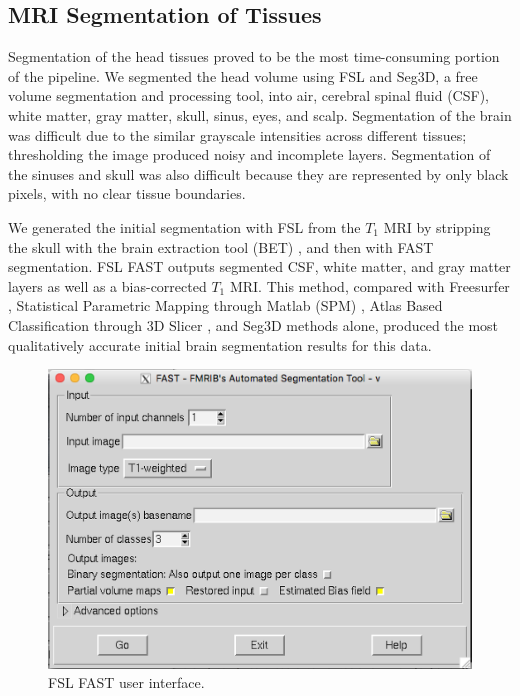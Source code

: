 \subsection{MRI Segmentation of Tissues}
\label{sec:Seg}


Segmentation of the head tissues proved to be the most time-consuming portion of the pipeline. We segmented the head volume using FSL and Seg3D, a free volume segmentation and processing tool, \cite{ref:seg3d} into air, cerebral spinal fluid (CSF), white matter, gray matter, skull, sinus, eyes, and scalp. Segmentation of the brain was difficult due to the similar grayscale intensities across different tissues; thresholding the image produced noisy and incomplete layers. Segmentation of the sinuses and skull was also difficult because they are represented by only black pixels, with no clear tissue boundaries.

We generated the initial segmentation with FSL from the $T_1$ MRI by stripping the skull with the brain extraction tool (BET) \cite{ref:bet1}, and then with FAST segmentation. FSL FAST outputs segmented CSF, white matter, and gray matter layers as well as a bias-corrected $T_1$ MRI. This method, compared with Freesurfer \cite{ref:freesurf}, Statistical Parametric Mapping through Matlab (SPM) \cite{ref:spm}, Atlas Based Classification through 3D Slicer \cite{ref:abc}, and Seg3D methods alone, produced the most qualitatively accurate initial brain segmentation results for this data.

\begin{figure}[H]
    \centering
    \includegraphics[width=.8\textwidth]{Figures/FSL_FAST}
    \caption{FSL FAST user interface.}
    \label{fig:fslfast}
\end{figure}

